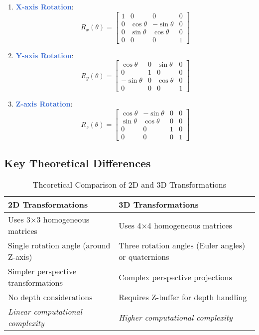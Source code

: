 \documentclass[12pt]{article}
\begin{document}
\begin{enumerate}
    \item \textcolor{highlight}{\textbf{X-axis Rotation}}:
    \[
    R_x(\theta) = \begin{bmatrix}
    1 & 0 & 0 & 0 \\
    0 & \cos\theta & -\sin\theta & 0 \\
    0 & \sin\theta & \cos\theta & 0 \\
    0 & 0 & 0 & 1
    \end{bmatrix}
    \]

    \item \textcolor{highlight}{\textbf{Y-axis Rotation}}:
    \[
    R_y(\theta) = \begin{bmatrix}
    \cos\theta & 0 & \sin\theta & 0 \\
    0 & 1 & 0 & 0 \\
    -\sin\theta & 0 & \cos\theta & 0 \\
    0 & 0 & 0 & 1
    \end{bmatrix}
    \]

    \item \textcolor{highlight}{\textbf{Z-axis Rotation}}:
    \[
    R_z(\theta) = \begin{bmatrix}
    \cos\theta & -\sin\theta & 0 & 0 \\
    \sin\theta & \cos\theta & 0 & 0 \\
    0 & 0 & 1 & 0 \\
    0 & 0 & 0 & 1
    \end{bmatrix}
    \]
\end{enumerate}

\subsection{Key Theoretical Differences}

\begin{table}[h]
\centering
\begin{tabulary}{\textwidth}{LL}
\toprule
\textbf{2D Transformations} & \textbf{3D Transformations} \\
\midrule
Uses 3×3 homogeneous matrices & Uses 4×4 homogeneous matrices \\
Single rotation angle (around Z-axis) & Three rotation angles (Euler angles) or quaternions \\
Simpler perspective transformations & Complex perspective projections \\
No depth considerations & Requires Z-buffer for depth handling \\
\textcolor{note}{\textit{Linear computational complexity}} & \textcolor{note}{\textit{Higher computational complexity}} \\
\bottomrule
\end{tabulary}
\caption{Theoretical Comparison of 2D and 3D Transformations}
\label{tab:theoretical-comparison}
\end{table}
\end{document}
